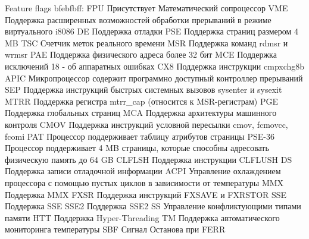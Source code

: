 \noindent
Feature flags bfebfbff: FPU Присутствует Математический сопроцессор VME Поддержка расширенных возможностей обработки прерываний в режиме виртуального i8086 DE Поддержка отладки PSE Поддержка страниц размером 4 MB TSC Счетчик меток реального времени MSR Поддержка команд rdmsr и wrmsr PAE Поддержка физического адреса более 32 бит MCE Поддержка исключений 18 - об аппаратных ошибках CX8 Поддержка инструкции cmpxchg8b APIC Микропроцессор содержит программно доступный контроллер прерываний SEP Поддержка инструкций быстрых системных вызовов sysenter и sysexit MTRR Поддержка регистра mtrr\_cap (относится к MSR-регистрам) PGE Поддержка глобальных страниц MCA Поддержка архитектуры машинного контроля CMOV Поддержка инструкций условной пересылки cmov, fcmovcc, fcomi PAT Процессор поддерживает таблицу атрибутов страницы PSE-36 Процессор поддерживает 4 MB страницы, которые способны адресовать физическую память до 64 GB CLFLSH Поддержка инструкции CLFLUSH DS Поддержка записи отладочной информации ACPI Управление охлаждением процессора с помощью пустых циклов в зависимости от температуры MMX Поддержка MMX FXSR Поддержка инструкций FXSAVE и FXRSTOR SSE Поддержка SSE SSE2 Поддержка SSE2 SS Управление конфликтующими типами памяти HTT Поддержка Hyper-Threading TM Поддержка автоматического мониторинга температуры SBF Сигнал Останова при FERR\newline

